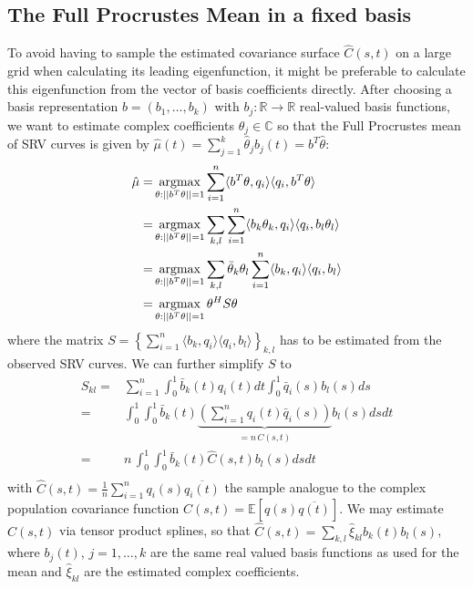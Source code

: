 \subsection{The Full Procrustes Mean in a fixed basis}
To avoid having to sample the estimated covariance surface $\hat{C}(s,t)$ on a large grid when calculating its leading eigenfunction, it might be preferable to calculate this eigenfunction from the vector of basis coefficients directly.
After choosing a basis representation $b = (b_1, \dots, b_k)$ with $b_j : \mathbb{R} \rightarrow \mathbb{R}$ real-valued basis functions, we want to estimate complex coefficients $\theta_j \in \mathbb{C}$ so that the Full Procrustes mean of SRV curves is given by $\hat{\mu}(t) = \sum_{j=1}^k \hat{\theta}_j b_j(t) = b^T \hat{\theta}$:
\begin{align*}
    \hat{\mu} =& \operatorname*{argmax}_{\theta : ||b^T\theta||=1} \sum_{i=1}^n \langle b^T\theta, q_i \rangle \langle q_i, b^T\theta \rangle \\
    =& \operatorname*{argmax}_{\theta : ||b^T\theta||=1} \sum_{k,l} \sum_{i=1}^n \langle b_k \theta_k, q_i \rangle \langle q_i, b_l \theta_l \rangle \\
    =& \operatorname*{argmax}_{\theta : ||b^T\theta||=1} \sum_{k,l} \bar{\theta}_k \theta_l \sum_{i=1}^n \langle b_k, q_i \rangle \langle q_i, b_l \rangle \\
    =& \operatorname*{argmax}_{\theta : ||b^T\theta||=1} \theta^H S \theta \\
\end{align*}
where the matrix $S = \left\{ \sum_{i=1}^n \langle b_k, q_i \rangle \langle q_i, b_l \rangle \right\}_{k,l}$ has to be estimated from the observed SRV curves.
We can further simplify $S$ to
\begin{align*}
    S_{kl} =& \sum_{i=1}^n \int_0^1 \bar{b}_k(t) q_i(t) dt \int_0^1 \bar{q}_i(s) b_l(s) ds \\
    =& \int_0^1 \int_0^1 \bar{b}_k(t) \underbrace{\left( \sum_{i=1}^n q_i(t) \bar{q}_i(s) \right)}_{= n \, \hat{C}(s,t)} b_l(s) ds dt\\
    =& n \, \int_0^1 \int_0^1 \bar{b}_k(t) \hat{C}(s,t) b_l(s) ds dt\\
\end{align*}
with $\hat{C}(s,t) = \frac{1}{n} \sum_{i=1}^n q_i(s) \overline{q_i(t)}$ the sample analogue to the complex population covariance function $C(s,t) = \mathbb{E}[q(s)\overline{q(t)}]$.
We may estimate $C(s,t)$ via tensor product splines, so that $\hat{C}(s,t) = \sum_{k,l} \hat{\xi}_{kl} b_k(t) b_l(s)$, where $b_j(t)$, $j=1,\dots,k$ are the same real valued basis functions as used for the mean and $\hat{\xi}_{kl}$ are the estimated complex coefficients.
